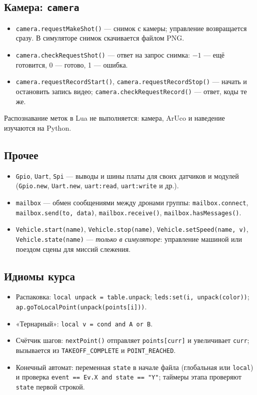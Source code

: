 \subsection{Камера: \texttt{camera}}
\begin{itemize}
  \item \verb|camera.requestMakeShot()| --- снимок с камеры; управление возвращается сразу. В симуляторе снимок скачивается файлом PNG.
  \item \verb|camera.checkRequestShot()| --- ответ на запрос снимка: $-1$ --- ещё готовится, 0 --- готово, 1 --- ошибка.
  \item \verb|camera.requestRecordStart()|, \verb|camera.requestRecordStop()| --- начать и остановить запись видео; \verb|camera.checkRequestRecord()| --- ответ, коды те же.
\end{itemize}
Распознавание меток в Lua не выполняется: камера, ArUco и наведение изучаются на Python.

\subsection{Прочее}
\begin{itemize}
  \item \verb|Gpio|, \verb|Uart|, \verb|Spi| --- выводы и шины платы для своих датчиков и модулей (\verb|Gpio.new|, \verb|Uart.new|, \verb|uart:read|, \verb|uart:write| и др.).
  \item \verb|mailbox| --- обмен сообщениями между дронами группы: \verb|mailbox.connect|, \verb|mailbox.send(to, data)|, \verb|mailbox.receive()|, \verb|mailbox.hasMessages()|.
  \item \verb|Vehicle.start(name)|, \verb|Vehicle.stop(name)|, \verb|Vehicle.setSpeed(name, v)|, \verb|Vehicle.state(name)| --- \emph{только в симуляторе}: управление машиной или поездом сцены для миссий слежения.
\end{itemize}

\subsection{Идиомы курса}
\begin{itemize}
\item Распаковка: \verb|local unpack = table.unpack|; \verb|leds:set(i, unpack(color))|; \verb|ap.goToLocalPoint(unpack(points[i]))|.
\item «Тернарный»: \verb|local v = cond and A or B|.
\item Счётчик шагов: \verb|nextPoint()| отправляет \verb|points[curr]| и увеличивает \verb|curr|; вызывается из \verb|TAKEOFF_COMPLETE| и \verb|POINT_REACHED|.
\item Конечный автомат: переменная \verb|state| в начале файла (глобальная или \verb|local|) и проверка \verb|event == Ev.X and state == "Y"|; таймеры этапа проверяют \verb|state| первой строкой.
\end{itemize}
